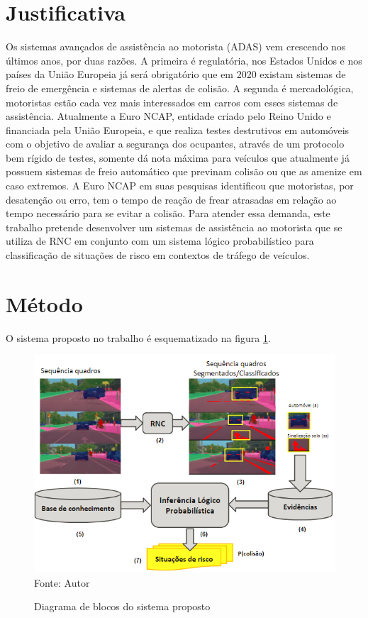 \documentclass[
	12pt,				%
    oneside,			%
	a4paper,			%
	english,			%
	french,				%
	spanish,			%
	brazil,				%
	]{abntex2}
\begin{document}
\section {Justificativa}
Os sistemas avançados de assistência ao motorista (ADAS) vem crescendo nos últimos anos, por duas razões. A primeira é regulatória, nos Estados Unidos e nos países da União Europeia já será obrigatório que em 2020 existam sistemas  de freio de emergência e sistemas de alertas de colisão. A segunda é mercadológica, motoristas estão cada vez mais interessados em carros com esses sistemas de assistência. Atualmente a Euro NCAP, entidade criado pelo Reino Unido e financiada pela União Europeia, e que realiza testes destrutivos em automóveis com o objetivo de avaliar a segurança dos ocupantes, através de um protocolo bem rígido de testes, somente dá nota máxima para veículos que atualmente já possuem sistemas de freio automático que previnam colisão ou que as amenize em caso extremos. A Euro NCAP em suas pesquisas identificou que motoristas, por desatenção ou erro, tem o tempo de reação de frear atrasadas em relação ao tempo necessário para se evitar a colisão. Para atender essa demanda, este trabalho pretende desenvolver um sistemas de assistência ao motorista que se utiliza de RNC em conjunto com um sistema lógico probabilístico para classificação de situações de risco em contextos de tráfego de veículos.

\section {Método}

O sistema proposto no trabalho é esquematizado na figura \ref{fig:diagrama_de_blocos}.

\begin{figure}[H]
    \centering
    \caption{Diagrama de blocos do sistema proposto}
    \includegraphics[width=\textwidth]{diagrama_de_blocos_v6}\\
    Fonte: Autor\hfill
    \label{fig:diagrama_de_blocos}
\end{figure} 
\end{document}
